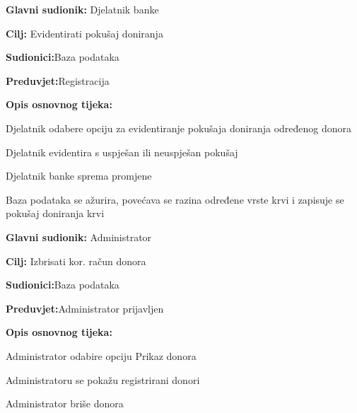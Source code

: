 \documentclass[11pt]{book}
\begin{document}
\noindent {}
\begin{packed_item}
	
	\item \textbf{Glavni sudionik: }{Djelatnik banke}
	\item  \textbf{Cilj:} {Evidentirati pokušaj doniranja}
	\item  \textbf{Sudionici:}{Baza podataka} 
	\item  \textbf{Preduvjet:}{Registracija}
	\item  \textbf{Opis osnovnog tijeka:}
	
	\item[] \begin{packed_enum}
		
		\item {Djelatnik odabere opciju za evidentiranje pokušaja doniranja određenog donora}
		\item {Djelatnik evidentira s uspješan ili neuspješan pokušaj}
		\item {Djelatnik banke sprema promjene}
		\item {Baza podataka se ažurira, povećava se razina određene vrste krvi i zapisuje se pokušaj doniranja krvi}
		
	\end{packed_enum}
	
\end{packed_item}
\noindent {}
\begin{packed_item}
	
	\item \textbf{Glavni sudionik: }{Administrator}
	\item  \textbf{Cilj:} {Izbrisati kor. račun donora}
	\item  \textbf{Sudionici:}{Baza podataka}
	\item  \textbf{Preduvjet:}{Administrator prijavljen}
	\item  \textbf{Opis osnovnog tijeka:}
	
	\item[] \begin{packed_enum}
		
		\item {Administrator odabire opciju Prikaz donora}
		\item {Administratoru se pokažu registrirani donori} 
		\item {Administrator briše donora}
		
	\end{packed_enum}
	
\end{packed_item}
\end{document}

